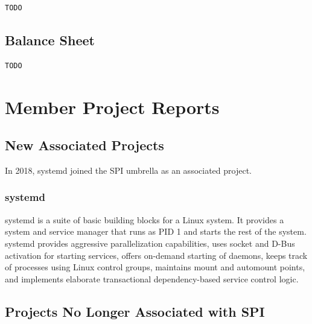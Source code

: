\documentclass[a4paper]{report}
\begin{document}
\begin{verbatim}
TODO
\end{verbatim}

\section{Balance Sheet}

\begin{verbatim}
TODO
\end{verbatim}

\chapter{Member Project Reports}

\section{New Associated Projects}

In 2018, systemd joined the SPI umbrella as an associated project.

\subsection{systemd}

systemd is a suite of basic building blocks for a Linux system. It
provides a system and service manager that runs as PID 1 and starts the
rest of the system. systemd provides aggressive parallelization
capabilities, uses socket and D-Bus activation for starting services,
offers on-demand starting of daemons, keeps track of processes using
Linux control groups, maintains mount and automount points, and
implements elaborate transactional dependency-based service control logic.

\section{Projects No Longer Associated with SPI}
\end{document}
